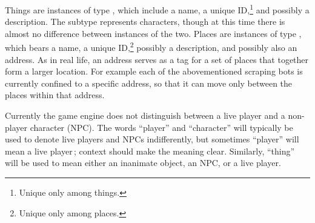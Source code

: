 Things are instances of type , which include a name,
a unique ID,\footnote{Unique only among things.} and possibly a description.
The subtype  represents characters, though at this time there
is almost no difference between instances of the two.
Places are instances of type , which bears a name,
a unique ID,\footnote{Unique only among places.}
possibly a description, and possibly also an address.
As in real life, an address serves as a tag for a set of places that together
form a larger location.
For example each of the abovementioned scraping bots is currently confined to
a specific address, so that it can move only between the places within that
address.

Currently the game engine does not distinguish between a live player and a
non-player character (NPC).
The words ``player'' and
``character'' will typically be used to denote live players and
NPCs indifferently, but sometimes ``player'' will mean a live player\,;
context should make the meaning clear.
Similarly, ``thing'' will be used to
mean either an inanimate object, an NPC, or a live player.
